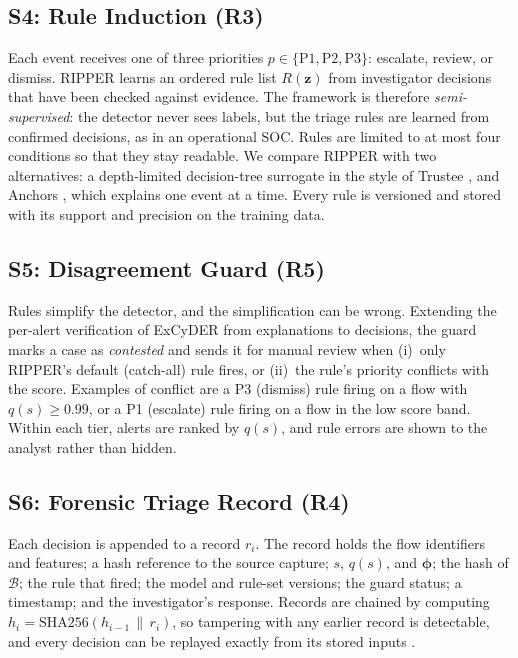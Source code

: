 \documentclass[journal]{IEEEtran}
\begin{document}
\subsection{S4: Rule Induction (R3)}
Each event receives one of three priorities $p\in\{\text{P1},\text{P2},\text{P3}\}$: escalate, review, or dismiss. RIPPER \cite{ripper} learns an ordered rule list $R(\mathbf{z})$ from investigator decisions that have been checked against evidence. The framework is therefore \emph{semi-supervised}: the detector never sees labels, but the triage rules are learned from confirmed decisions, as in an operational SOC. Rules are limited to at most four conditions so that they stay readable. We compare RIPPER with two alternatives: a depth-limited decision-tree surrogate in the style of Trustee \cite{trustee}, and Anchors \cite{anchors}, which explains one event at a time. Every rule is versioned and stored with its support and precision on the training data.

\subsection{S5: Disagreement Guard (R5)}
Rules simplify the detector, and the simplification can be wrong. Extending the per-alert verification of ExCyDER \cite{excyder} from explanations to decisions, the guard marks a case as \emph{contested} and sends it for manual review when (i)~only RIPPER's default (catch-all) rule fires, or (ii)~the rule's priority conflicts with the score. Examples of conflict are a P3 (dismiss) rule firing on a flow with $q(s)\geq 0.99$, or a P1 (escalate) rule firing on a flow in the low score band. Within each tier, alerts are ranked by $q(s)$, and rule errors are shown to the analyst rather than hidden.

\subsection{S6: Forensic Triage Record (R4)}
Each decision is appended to a record $r_i$. The record holds the flow identifiers and features; a hash reference to the source capture; $s$, $q(s)$, and $\boldsymbol{\phi}$; the hash of $\mathcal{B}$; the rule that fired; the model and rule-set versions; the guard status; a timestamp; and the investigator's response. Records are chained by computing $h_i=\mathrm{SHA256}(h_{i-1}\,\|\,r_i)$, so tampering with any earlier record is detectable, and every decision can be replayed exactly from its stored inputs \cite{nist}.
\end{document}
